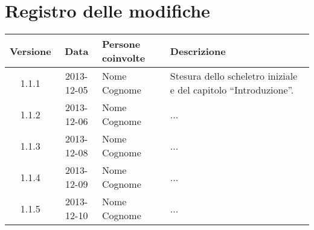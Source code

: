 \section*{Registro delle modifiche}

\small{
\begin{tabularx}{\textwidth}{|c|c|l|X|}
 \hline \textbf{Versione} & \textbf{Data} & \textbf{Persone coinvolte} & \textbf{Descrizione} \\

 
 \hline 1.1.1 & 2013-12-05 & Nome Cognome &
 Stesura dello scheletro iniziale e del capitolo ``Introduzione''.\\

 \hline 1.1.2 & 2013-12-06 & Nome Cognome &
 ...\\

 \hline 1.1.3 & 2013-12-08 & Nome Cognome &
 ...\\

 \hline 1.1.4 & 2013-12-09 & Nome Cognome &
 ...\\

 \hline 1.1.5 & 2013-12-10 & Nome Cognome &
 ...\\

 \hline
\end{tabularx}
}

